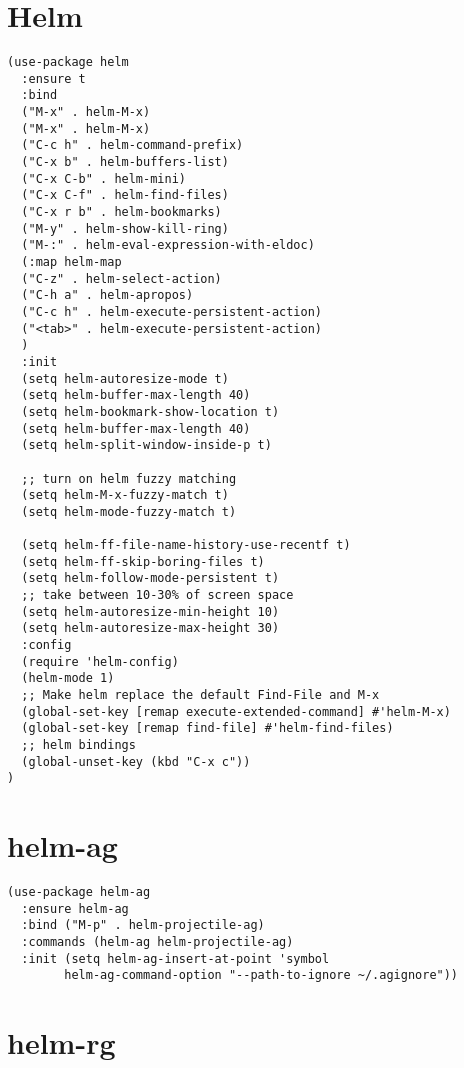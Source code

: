 \documentclass[11pt]{article}
\begin{document}
\section*{Helm}
\label{sec:orgd58dc3c}

\begin{verbatim}
(use-package helm
  :ensure t
  :bind
  ("M-x" . helm-M-x)
  ("M-x" . helm-M-x)
  ("C-c h" . helm-command-prefix)
  ("C-x b" . helm-buffers-list)
  ("C-x C-b" . helm-mini)
  ("C-x C-f" . helm-find-files)
  ("C-x r b" . helm-bookmarks)
  ("M-y" . helm-show-kill-ring)
  ("M-:" . helm-eval-expression-with-eldoc)
  (:map helm-map
  ("C-z" . helm-select-action)
  ("C-h a" . helm-apropos)
  ("C-c h" . helm-execute-persistent-action)
  ("<tab>" . helm-execute-persistent-action)
  )
  :init
  (setq helm-autoresize-mode t)
  (setq helm-buffer-max-length 40)
  (setq helm-bookmark-show-location t)
  (setq helm-buffer-max-length 40)
  (setq helm-split-window-inside-p t)

  ;; turn on helm fuzzy matching
  (setq helm-M-x-fuzzy-match t)
  (setq helm-mode-fuzzy-match t)

  (setq helm-ff-file-name-history-use-recentf t)
  (setq helm-ff-skip-boring-files t)
  (setq helm-follow-mode-persistent t)
  ;; take between 10-30% of screen space
  (setq helm-autoresize-min-height 10)
  (setq helm-autoresize-max-height 30)
  :config
  (require 'helm-config)
  (helm-mode 1)
  ;; Make helm replace the default Find-File and M-x
  (global-set-key [remap execute-extended-command] #'helm-M-x)
  (global-set-key [remap find-file] #'helm-find-files)
  ;; helm bindings
  (global-unset-key (kbd "C-x c"))
)
\end{verbatim}

\section*{helm-ag}
\label{sec:org9eb8eba}

\begin{verbatim}
(use-package helm-ag
  :ensure helm-ag
  :bind ("M-p" . helm-projectile-ag)
  :commands (helm-ag helm-projectile-ag)
  :init (setq helm-ag-insert-at-point 'symbol
        helm-ag-command-option "--path-to-ignore ~/.agignore"))
\end{verbatim}

\section*{helm-rg}
\label{sec:org2eeb811}
\end{document}
